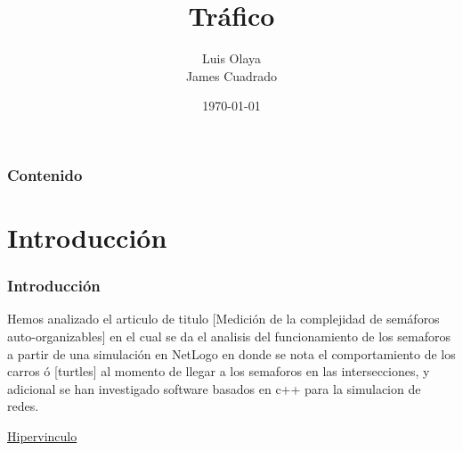 \documentclass{beamer}
\title[Trafico]{Tráfico} %
\author{Luis Olaya \\James Cuadrado} %
\institute[UPA] %
{
Universidad de Pamplona \\ %

}
\date{\today} %
\begin{document}
\justifying 

\begin{frame}
\titlepage %
\end{frame}

\begin{frame}
\frametitle{Contenido} %
\tableofcontents %
\end{frame}


\section{Introducción} %


\begin{frame}
\frametitle{Introducción}

	\justifying 
 Hemos  analizado el articulo de titulo [Medición de la complejidad de semáforos auto-organizables] en el cual se da el analisis del funcionamiento de los semaforos a partir de una simulación en NetLogo en donde se nota el comportamiento de los carros ó [turtles] al momento de llegar a los semaforos en las intersecciones, y adicional se han investigado software basados en c++ para la simulacion de redes. 
 
\href{https://es.wikipedia.org/wiki/IEEE_802.15}{Hipervinculo}
\end{frame}
\end{document}
